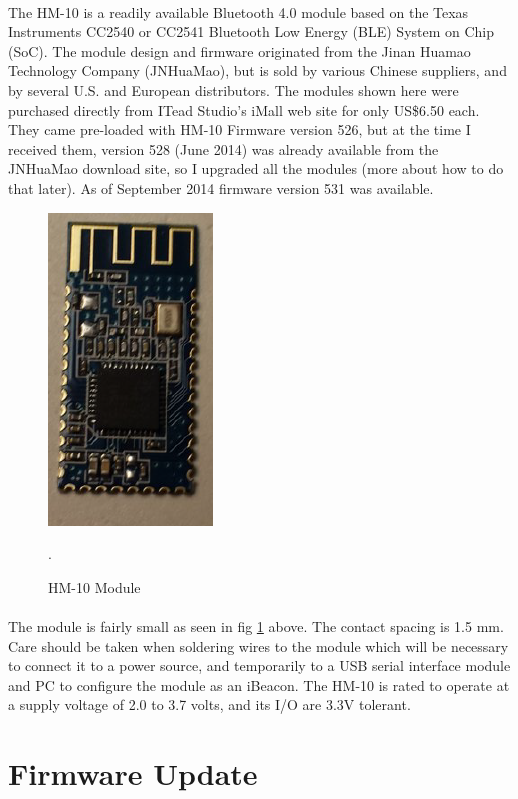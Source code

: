 \documentclass[a4paper,12pt]{report}
\begin{document}
\paragraph{} The HM-10 is a readily available Bluetooth 4.0 module based on the Texas Instruments CC2540 or CC2541 Bluetooth Low Energy (BLE) System on Chip (SoC). The module design and firmware originated from the Jinan Huamao Technology Company (JNHuaMao), but is sold by various Chinese suppliers, and by several U.S. and European distributors. The modules shown here were purchased directly from ITead Studio’s iMall web site for only US\$6.50 each. They came pre-loaded with HM-10 Firmware version 526, but at the time I received them, version 528 (June 2014) was already available from the JNHuaMao download site, so I upgraded all the modules (more about how to do that later). As of September 2014 firmware version 531 was available.
\vspace{1cm}
\begin{figure}[!h]
	\begin{center}
		\includegraphics[width=.25\textwidth]{hm10.png}    
		\caption{HM-10 Module}.
		\label{fig4}
	\end{center}
\end{figure}
\paragraph{}The module is fairly small as seen in fig \ref{fig4} above. The contact spacing is 1.5 mm. Care should be taken when soldering wires to the module which will be necessary to connect it to a power source, and temporarily to a USB serial interface module and PC to configure the module as an iBeacon. The HM-10 is rated to operate at a supply voltage of 2.0 to 3.7 volts, and its I/O are 3.3V tolerant.
\section{Firmware Update}
\end{document}
